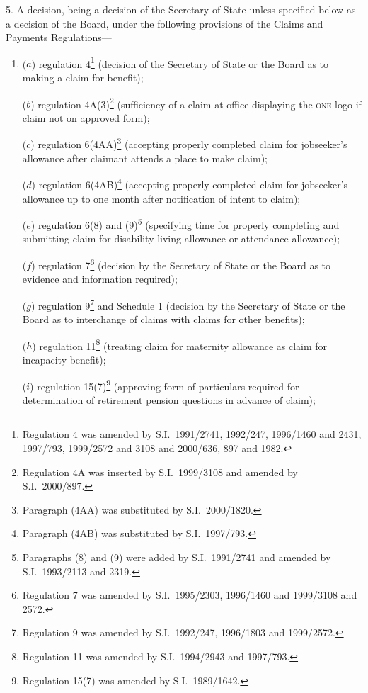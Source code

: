 \documentclass[12pt,a4paper]{article}
\begin{document}
5.  A decision, being a decision of the Secretary of State unless specified below as a decision of the Board, under the following provisions of the Claims and Payments Regulations—
\begin{enumerate}\item[]
($a$) regulation 4\footnote{Regulation 4 was amended by S.I.\ 1991/2741, 1992/247, 1996/1460 and 2431, 1997/793, 1999/2572 and 3108 and 2000/636, 897 and 1982.} (decision of the Secretary of State or the Board as to making a claim for benefit);

($b$) regulation 4A(3)\footnote{Regulation 4A was inserted by S.I.\ 1999/3108 and amended by S.I.\ 2000/897.} (sufficiency of a claim at office displaying the \textsc{\lowercase{ONE}} logo if claim not on approved form);

($c$) regulation 6(4AA)\footnote{Paragraph (4AA) was substituted by S.I.\ 2000/1820.} (accepting properly completed claim for jobseeker’s allowance after claimant attends a place to make claim);

($d$) regulation 6(4AB)\footnote{Paragraph (4AB) was substituted by S.I.\ 1997/793.} (accepting properly completed claim for jobseeker’s allowance up to one month after notification of intent to claim);

($e$) regulation 6(8) and (9)\footnote{Paragraphs (8) and (9) were added by S.I.\ 1991/2741 and amended by S.I.\ 1993/2113 and 2319.} (specifying time for properly completing and submitting claim for disability living allowance or attendance allowance);

($f$) regulation 7\footnote{Regulation 7 was amended by S.I.\ 1995/2303, 1996/1460 and 1999/3108 and 2572.} (decision by the Secretary of State or the Board as to evidence and information required);

($g$) regulation 9\footnote{Regulation 9 was amended by S.I.\ 1992/247, 1996/1803 and 1999/2572.} and Schedule 1 (decision by the Secretary of State or the Board as to interchange of claims with claims for other benefits);

($h$) regulation 11\footnote{Regulation 11 was amended by S.I.\ 1994/2943 and 1997/793.} (treating claim for maternity allowance as claim for incapacity benefit);

($i$) regulation 15(7)\footnote{Regulation 15(7) was amended by S.I.\ 1989/1642.} (approving form of particulars required for determination of retirement pension questions in advance of claim);


\end{enumerate}
\end{document}

